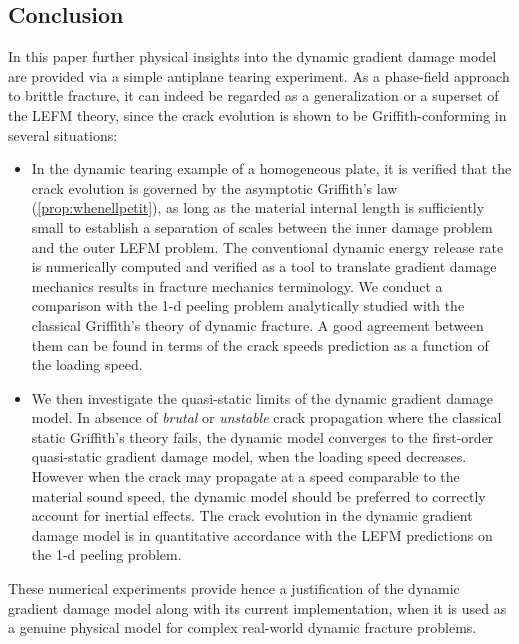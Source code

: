 \subsection*{Conclusion}
In this paper further physical insights into the dynamic gradient damage model are provided via a simple antiplane tearing experiment. As a phase-field approach to brittle fracture, it can indeed be regarded as a generalization or a superset of the LEFM theory, since the crack evolution is shown to be Griffith-conforming in several situations:
\begin{itemize}
\item In the dynamic tearing example of a homogeneous plate, it is verified that the crack evolution is governed by the asymptotic Griffith's law (\cref{prop:whenellpetit}), as long as the material internal length is sufficiently small to establish a separation of scales between the inner damage problem and the outer LEFM problem. The conventional dynamic energy release rate is numerically computed and verified as a tool to translate gradient damage mechanics results in fracture mechanics terminology. We conduct a comparison with the 1-d peeling problem \cite{DumouchelMarigoCharlotte:2008} analytically studied with the classical Griffith's theory of dynamic fracture. A good agreement between them can be found in terms of the crack speeds prediction as a function of the loading speed.

\item We then investigate the quasi-static limits of the dynamic gradient damage model. In absence of \emph{brutal} or \emph{unstable} crack propagation where the classical static Griffith's theory fails, the dynamic model converges to the first-order quasi-static gradient damage model, when the loading speed decreases. However when the crack may propagate at a speed comparable to the material sound speed, the dynamic model should be preferred to correctly account for inertial effects. The crack evolution in the dynamic gradient damage model is in quantitative accordance with the LEFM predictions on the 1-d peeling problem.
\end{itemize}

These numerical experiments provide hence a justification of the dynamic gradient damage model along with its current implementation, when it is used as a genuine physical model for complex real-world dynamic fracture problems.

